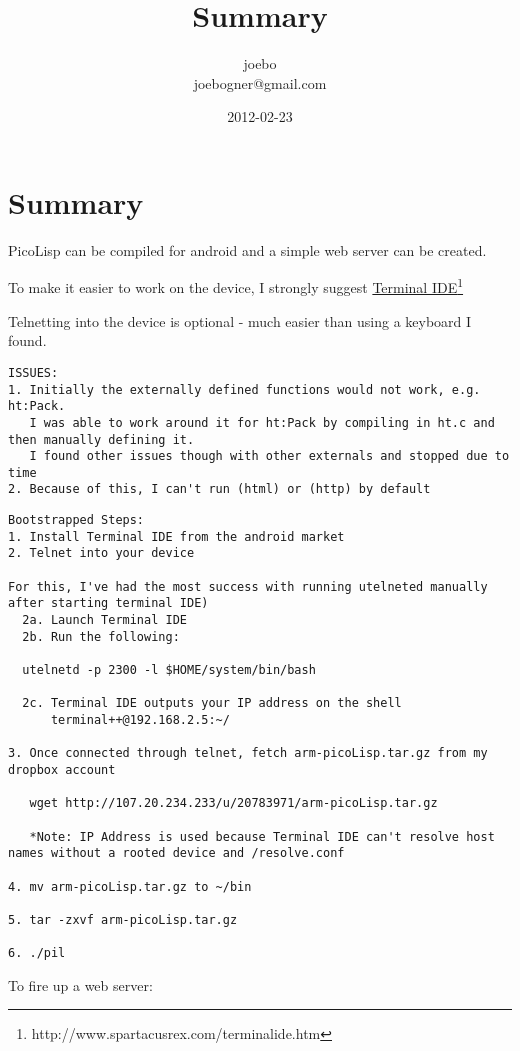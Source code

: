 \documentclass[10pt,a4paper]{article}
\title{Summary}
\author{joebo\\joebogner@gmail.com}
\date{2012-02-23}
\begin{document}
\maketitle

\section*{Summary}
PicoLisp can be compiled for android and a simple web server can be created.

To make it easier to work on the device, I strongly suggest \underline{Terminal IDE}\footnote{http://www.spartacusrex.com/terminalide.htm}

Telnetting into the device is optional - much easier than using a keyboard I found.

\begin{verbatim}
ISSUES:
1. Initially the externally defined functions would not work, e.g. ht:Pack.
   I was able to work around it for ht:Pack by compiling in ht.c and then manually defining it.
   I found other issues though with other externals and stopped due to time
2. Because of this, I can't run (html) or (http) by default
\end{verbatim}


\begin{verbatim}
Bootstrapped Steps:
1. Install Terminal IDE from the android market
2. Telnet into your device

For this, I've had the most success with running utelneted manually after starting terminal IDE)
  2a. Launch Terminal IDE
  2b. Run the following:

  utelnetd -p 2300 -l $HOME/system/bin/bash

  2c. Terminal IDE outputs your IP address on the shell
      terminal++@192.168.2.5:~/

3. Once connected through telnet, fetch arm-picoLisp.tar.gz from my dropbox account

   wget http://107.20.234.233/u/20783971/arm-picoLisp.tar.gz

   *Note: IP Address is used because Terminal IDE can't resolve host names without a rooted device and /resolve.conf

4. mv arm-picoLisp.tar.gz to ~/bin

5. tar -zxvf arm-picoLisp.tar.gz

6. ./pil

\end{verbatim}


To fire up a web server:
\end{document}

